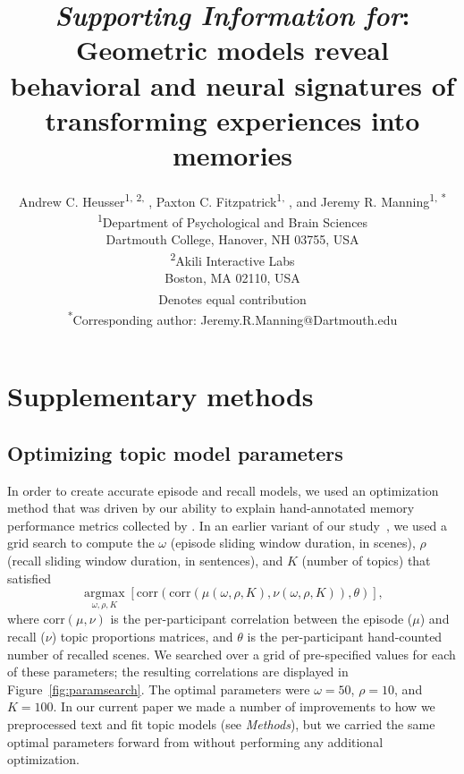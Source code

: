 \documentclass{article}
\title{\textit{Supporting Information for}: Geometric models reveal behavioral and neural signatures of transforming experiences into memories}
\author{Andrew C. Heusser\textsuperscript{1, 2, \textdagger}, Paxton C. Fitzpatrick\textsuperscript{1, \textdagger}, and Jeremy R. Manning\textsuperscript{1, *}\\\textsuperscript{1}Department of Psychological and Brain Sciences\\Dartmouth College, Hanover, NH 03755, USA\\\textsuperscript{2}Akili Interactive Labs\\Boston, MA 02110, USA\\\textsuperscript{\textdagger}Denotes equal contribution\\\textsuperscript{*}Corresponding author: Jeremy.R.Manning@Dartmouth.edu}
\newcommand{\argmax}{\mathop{\mathrm{argmax}}\limits}
\begin{document}
\renewcommand{\figurename}{Supplementary Figure}


\setcounter{equation}{0}
\setcounter{figure}{0}
\setcounter{table}{0}
\setcounter{page}{1}
\setcounter{section}{0}
\makeatletter
\renewcommand{\bibnumfmt}[1]{[S#1]}
\renewcommand{\citenumfont}[1]{S#1}



\section*{Supplementary methods}
\subsection*{Optimizing topic model parameters}
In order to create accurate episode and recall models, we used an optimization method that was driven by our ability to explain hand-annotated memory performance metrics collected by \cite{ChenEtal17}.  In an earlier variant of our study~\citep{HeusMann18}, we used a grid search to compute the $\omega$ (episode sliding window duration, in scenes), $\rho$ (recall sliding window duration, in sentences), and $K$ (number of topics) that satisfied
\[
\argmax_{\omega, \rho, K} \left[\mathrm{corr}\left(\mathrm{corr}\left(\mu\left(\omega, \rho, K\right), \nu\left(\omega, \rho, K\right)\right), \theta\right)\right],
\]
where $\mathrm{corr}(\mu, \nu)$ is the per-participant correlation between the episode ($\mu$) and recall ($\nu$) topic proportions matrices, and $\theta$ is the per-participant hand-counted number of recalled scenes.  We searched over a grid of pre-specified values for each of these parameters; the resulting correlations are displayed in Figure~\ref{fig:paramsearch}.  The optimal parameters were $\omega = 50$, $\rho = 10$, and $K = 100$.  In our current paper we made a number of improvements to how we preprocessed text and fit topic models (see \textit{Methods}), but we carried the same optimal parameters forward from \cite{HeusMann18} without performing any additional optimization.
\end{document}
